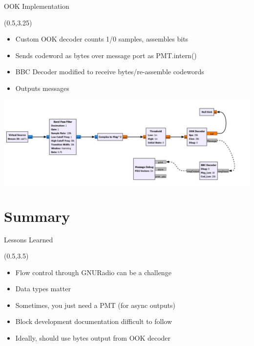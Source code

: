 \documentclass[xcolor=x11names,compress,handout]{beamer}
\begin{document}
\begin{frame}{OOK Implementation}
	
	\begin{textblock}{14.5}(0.5,3.25)
		\begin{itemize}
			\item Custom OOK decoder counts 1/0 samples, assembles bits
			\item Sends codeword as bytes over message port as PMT.intern()
			\item BBC Decoder modified to receive bytes/re-assemble codewords
			\item Outputs messages 
		\end{itemize}
		\vspace{0pt}
		\includegraphics[scale=0.45]{./figures/bbc_ook_2}
	\end{textblock}
\end{frame}


\section{Summary}
\begin{frame}{Lessons Learned}

	\begin{textblock}{14.5}(0.5,3.5)
		\begin{itemize}
			\item Flow control through GNURadio can be a challenge
			\item Data types matter
			\item Sometimes, you just need a PMT (for async outputs)
			\item Block development documentation difficult to follow
			\item Ideally, should use bytes output from OOK decoder

		\end{itemize}
	\end{textblock}
\end{frame}
\end{document}
